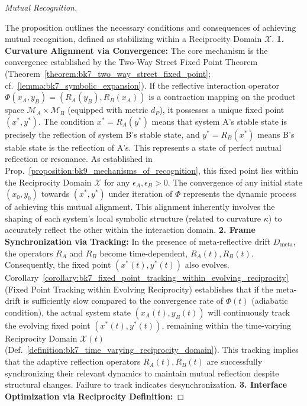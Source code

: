 \begin{proof}[Mutual Recognition]
\label{proof:bk9_mutual_recognition}
\leavevmode

The proposition outlines the necessary conditions and consequences of achieving mutual recognition, defined as stabilizing within a Reciprocity Domain $\mathcal{X}$.
\textbf{1. Curvature Alignment via Convergence:}
The core mechanism is the convergence established by the Two-Way Street Fixed Point Theorem (Theorem~\ref{theorem:bk7_two_way_street_fixed_point}; cf.~\ref{lemma:bk7_symbolic_expansion}). If the reflective interaction operator $\Phi(x_A, y_B) = (R_A(y_B), R_B(x_A))$ is a contraction mapping on the product space $\mathcal{M}_A \times \mathcal{M}_B$ (equipped with metric $d_P$), it possesses a unique fixed point $(x^*, y^*)$. The condition $x^* = R_A(y^*)$ means that system A's stable state is precisely the reflection of system B's stable state, and $y^* = R_B(x^*)$ means B's stable state is the reflection of A's. This represents a state of perfect mutual reflection or resonance. As established in Prop.~\ref{proposition:bk9_mechanisms_of_recognition}, this fixed point lies within the Reciprocity Domain $\mathcal{X}$ for any $\epsilon_A, \epsilon_B > 0$. The convergence of any initial state $(x_0, y_0)$ towards $(x^*, y^*)$ under iteration of $\Phi$ represents the dynamic process of achieving this mutual alignment. This alignment inherently involves the shaping of each system's local symbolic structure (related to curvature $\kappa$) to accurately reflect the other within the interaction domain.
\textbf{2. Frame Synchronization via Tracking:}
In the presence of meta-reflective drift $D_{\text{meta}}$, the operators $R_A$ and $R_B$ become time-dependent, $R_A(t), R_B(t)$. Consequently, the fixed point $(x^*(t), y^*(t))$ also evolves. Corollary~\ref{corollary:bk7_fixed_point_tracking_within_evolving_reciprocity} (Fixed Point Tracking within Evolving Reciprocity) establishes that if the meta-drift is sufficiently slow compared to the convergence rate of $\Phi(t)$ (adiabatic condition), the actual system state $(x_A(t), y_B(t))$ will continuously track the evolving fixed point $(x^*(t), y^*(t))$, remaining within the time-varying Reciprocity Domain $\mathcal{X}(t)$ (Def.~\ref{definition:bk7_time_varying_reciprocity_domain}). This tracking implies that the adaptive reflection operators $R_A(t), R_B(t)$ are successfully synchronizing their relevant dynamics to maintain mutual reflection despite structural changes. Failure to track indicates desynchronization.
\textbf{3. Interface Optimization via Reciprocity Definition:}

\end{proof}
